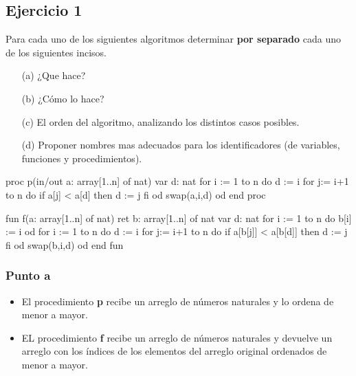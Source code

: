 \subsection{Ejercicio 1}
Para cada uno de los siguientes algoritmos determinar \textbf{por separado} cada uno de los siguientes incisos.
\begin{itemize}
    \item[(a)] ¿Que hace?
    \item[(b)] ¿Cómo lo hace?
    \item[(c)] El orden del algoritmo, analizando los distintos casos posibles.
    \item[(d)] Proponer nombres mas adecuados para los identificadores (de variables, funciones y procedimientos).   
\end{itemize}
\begin{codebox}
\begin{pascallike}
proc p(in/out a: array[1..n] of nat)
    var d: nat
    for i := 1 to n do
        d := i
        for j:= i+1 to n do
            if a[j] < a[d] then
                d := j
            fi
        od
        swap(a,i,d)
    od
end proc 
\end{pascallike}
\end{codebox}
\begin{codebox}
\begin{pascallike}
fun f(a: array[1..n] of nat) ret b: array[1..n] of nat
    var d: nat
    for i := 1 to n do
        b[i] := i
    od
    for i := 1 to n do
        d := i
        for j:= i+1 to n do
            if a[b[j]] < a[b[d]] then
                d := j
            fi
        od
        swap(b,i,d)
    od
end fun
\end{pascallike}
\end{codebox}

\subsubsection{Punto a}
\begin{itemize}
    \item El procedimiento \textbf{p} recibe un arreglo de números naturales y lo ordena de menor a mayor.
    \item EL procedimiento \textbf{f} recibe un arreglo de números naturales y devuelve un arreglo con los índices de los elementos del arreglo original ordenados de menor a mayor.
\end{itemize}

